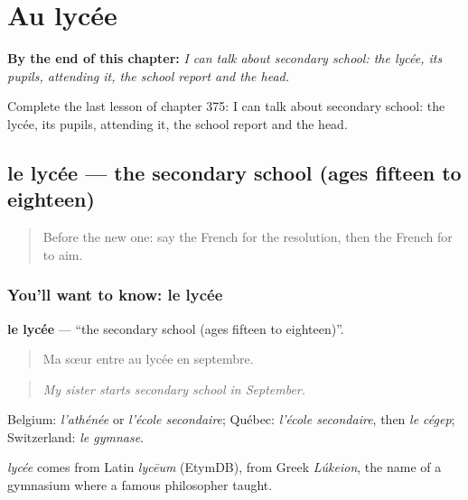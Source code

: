 
\chapter{Au lycée}
\label{ch:fr-au-lycee}

\begin{chapteropening}
\textbf{By the end of this chapter:} \emph{I can talk about secondary school: the lycée, its pupils, attending it, the school report and the head.}

Complete the last lesson of chapter 375: I can talk about secondary school: the lycée, its pupils, attending it, the school report and the head.
\end{chapteropening}

\section[le lycée]{le lycée — the secondary school (ages fifteen to eighteen)}

\label{lesson:FR-C375-lycee}



\begin{quote}
Before the new one: say the French for the resolution, then the French for to aim.
\end{quote}

\subsection*{You'll want to know: le lycée}
\textbf{le lycée} — \textquotedblleft{}the secondary school (ages fifteen to eighteen)\textquotedblright{}.

\begin{quote}
Ma sœur entre au lycée en septembre.
\end{quote}

\begin{quote}
\emph{My sister starts secondary school in September.}
\end{quote}

Belgium: \emph{l'athénée} or \emph{l'école secondaire}; Québec: \emph{l'école secondaire}, then \emph{le cégep}; Switzerland: \emph{le gymnase}.

\begin{cousinweb}
\emph{lycée} comes from Latin \emph{lycēum} (EtymDB), from Greek \emph{Lúkeion}, the name of a gymnasium where a famous philosopher taught.
\end{cousinweb}

